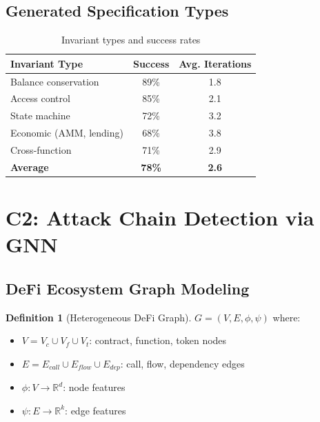 \documentclass[11pt]{article}
\theoremstyle{definition}
\newtheorem{definition}{Definition}[section]
\theoremstyle{plain}
\theoremstyle{remark}
\begin{document}
\subsection{Generated Specification Types}

\begin{table}[H]
\centering
\caption{Invariant types and success rates}
\label{tab:invariant_types}
\begin{tabular}{lcc}
\toprule
\textbf{Invariant Type} & \textbf{Success} & \textbf{Avg. Iterations} \\
\midrule
Balance conservation & 89\% & 1.8 \\
Access control & 85\% & 2.1 \\
State machine & 72\% & 3.2 \\
Economic (AMM, lending) & 68\% & 3.8 \\
Cross-function & 71\% & 2.9 \\
\midrule
\textbf{Average} & \textbf{78\%} & \textbf{2.6} \\
\bottomrule
\end{tabular}
\end{table}

\section{C2: Attack Chain Detection via GNN}
\label{sec:gnn}

\subsection{DeFi Ecosystem Graph Modeling}

\begin{definition}[Heterogeneous DeFi Graph]
$G = (V, E, \phi, \psi)$ where:
\begin{itemize}
    \item $V = V_c \cup V_f \cup V_t$: contract, function, token nodes
    \item $E = E_{call} \cup E_{flow} \cup E_{dep}$: call, flow, dependency edges
    \item $\phi: V \rightarrow \mathbb{R}^d$: node features
    \item $\psi: E \rightarrow \mathbb{R}^k$: edge features
\end{itemize}
\end{definition}
\end{document}
